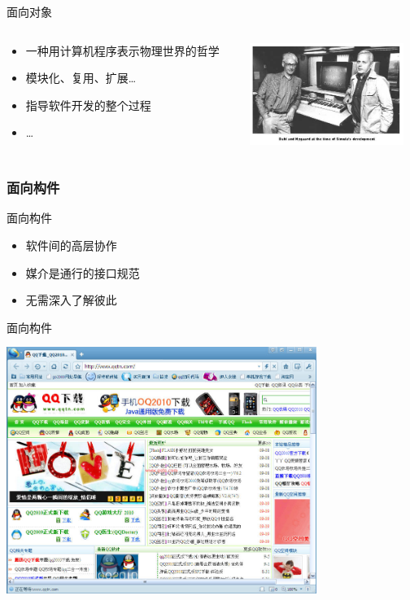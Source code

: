 \begin{frame}{面向对象}
  \begin{columns}
    \begin{column}{.5\textwidth}
      \begin{itemize}
        \item 一种用计算机程序表示物理世界的哲学
          \pause
        \item 模块化、复用、扩展\dots
          \pause
        \item 指导软件开发的整个过程
        \item \dots
      \end{itemize}
    \end{column}
    \begin{column}{.5\textwidth}
      \includegraphics[width=5cm]{dahl_nygaard.jpg}
    \end{column}
  \end{columns}
\end{frame}

\subsubsection{面向构件}

\begin{frame}[fragile]{面向构件}
  \begin{itemize}
    \item 软件间的高层协作
    \item 媒介是通行的接口规范
    \item 无需深入了解彼此
  \end{itemize}
\end{frame}

\begin{frame}{面向构件}
  \begin{center}
    \includegraphics[height=8cm]{qqbrowser.jpg}
  \end{center}
\end{frame}



